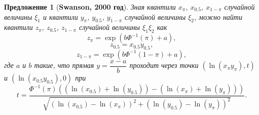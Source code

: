 \documentclass[12pt]{article}
\newtheorem{proposition}[theorem]{Предложение}
\begin{document}
	\begin{proposition}[\textbf{Swanson, 2000 год}]
		Зная квантили $x_{\pi}$, $x_{0.5}$, $x_{1-\pi}$ случайной величины $\xi_{1}$ и квантили $y_{\pi}$, $y_{0.5}$, $y_{1-\pi}$ случайной величины $\xi_{2}$, можно найти квантили $z_{\pi}$, $z_{0.5}$, $z_{1-\pi}$ случайной величины $\xi_{1}\xi_{2}$ как
		\begin{equation*}
			z_{\pi}=\exp(b\Phi^{-1}(\pi)+a),
		\end{equation*}
		\begin{equation*}
			z_{0.5}=x_{0.5}y_{0.5},
		\end{equation*}
		\begin{equation*}
			z_{1-\pi}=\exp(b\Phi^{-1}(1-\pi)+a),
		\end{equation*}
		где $a$ и $b$ такие, что прямая $y=\dfrac{x-a}{b}$ проходит через точки $(\ln(x_{\pi}y_{\pi}), t)$ и $(\ln(x_{0.5}y_{0.5}),0)$ при
		\begin{equation*}
			t = \frac{\Phi^{-1}(\pi)((\ln(x_{0.5})+\ln(y_{0.5}))-(\ln(x_{\pi})+\ln(y_{\pi})))}{\sqrt{(\ln(x_{0.5})-\ln(x_{\pi}))^{2}+(\ln(y_{0.5})-\ln(y_{\pi}))^{2}}}. 
		\end{equation*}
	\end{proposition}
\end{document}
